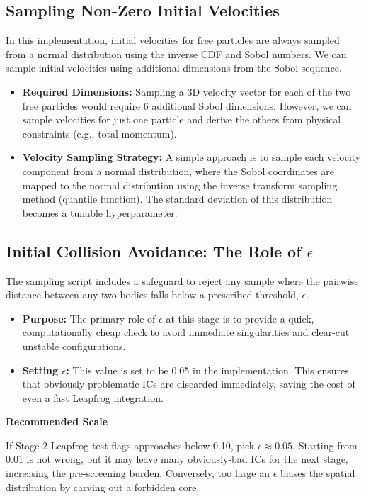 \documentclass{article}
\begin{document}
\subsection{Sampling Non-Zero Initial Velocities}
In this implementation, initial velocities for free particles are always sampled from a normal distribution using the inverse CDF and
 Sobol numbers. We can sample initial velocities using additional dimensions from the Sobol sequence.

\begin{itemize}
    \item \textbf{Required Dimensions:} Sampling a 3D velocity vector for each of the two free particles would require 6 additional Sobol dimensions. However, we can sample velocities for just one particle and derive the others from physical constraints (e.g., total momentum).
    \item \textbf{Velocity Sampling Strategy:} A simple approach is to sample each velocity component from a normal distribution, where the Sobol coordinates are mapped to the normal distribution using the inverse transform sampling method (quantile function). The standard deviation of this distribution becomes a tunable hyperparameter.
\end{itemize}

\subsection{Initial Collision Avoidance: The Role of \texorpdfstring{$\epsilon$}{epsilon}}
The sampling script includes a safeguard to reject any sample where the pairwise distance between any two bodies falls below a prescribed threshold, $\epsilon$.
\begin{itemize}
    \item \textbf{Purpose:} The primary role of $\epsilon$ at this stage is to provide a quick, computationally cheap check to avoid immediate singularities and clear-cut unstable configurations.
    \item \textbf{Setting $\epsilon$:} This value is set to be 0.05 in the implementation.
    This ensures that obviously problematic ICs are discarded immediately, saving the cost of even a fast Leapfrog integration.
\end{itemize}

\textbf{Recommended Scale}

If Stage 2 Leapfrog test flags approaches below 0.10, pick $\epsilon \approx 0.05$. Starting from 0.01 is not wrong, but it may leave many obviously-bad ICs for the next stage, increasing the pre-screening burden. Conversely, too large an $\epsilon$ biases the spatial distribution by carving out a forbidden core.
\end{document}
